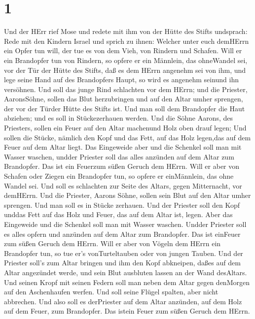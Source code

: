\hypertarget{section}{%
\section{1}\label{section}}

 Und der HErr rief Mose und redete mit ihm von der Hütte des
Stifts undsprach:  Rede mit den Kindern Israel und sprich zu
ihnen: Welcher unter euch demHErrn ein Opfer tun will, der tue es von
dem Vieh, von Rindern und Schafen.  Will er ein Brandopfer
tun von Rindern, so opfere er ein Männlein, das ohneWandel sei, vor der
Tür der Hütte des Stifts, daß es dem HErrn angenehm sei von ihm,
 und lege seine Hand auf des Brandopfers Haupt, so wird es
angenehm seinund ihn versöhnen.  Und soll das junge Rind
schlachten vor dem HErrn; und die Priester, AaronsSöhne, sollen das Blut
herzubringen und auf den Altar umher sprengen, der vor der Türder Hütte
des Stifts ist.  Und man soll dem Brandopfer die Haut
abziehen; und es soll in Stückezerhauen werden.  Und die
Söhne Aarons, des Priesters, sollen ein Feuer auf den Altar machenund
Holz oben drauf legen;  Und sollen die Stücke, nämlich den
Kopf und das Fett, auf das Holz legen,das auf dem Feuer auf dem Altar
liegt.  Das Eingeweide aber und die Schenkel soll man mit
Wasser waschen, undder Priester soll das alles anzünden auf dem Altar
zum Brandopfer. Das ist ein Feuerzum süßen Geruch dem HErrn.
 Will er aber von Schafen oder Ziegen ein Brandopfer tun,
so opfere er einMännlein, das ohne Wandel sei.  Und soll es
schlachten zur Seite des Altars, gegen Mitternacht, vor demHErrn. Und
die Priester, Aarons Söhne, sollen sein Blut auf den Altar umher
sprengen.  Und man soll es in Stücke zerhauen. Und der
Priester soll den Kopf unddas Fett auf das Holz und Feuer, das auf dem
Altar ist, legen.  Aber das Eingeweide und die Schenkel
soll man mit Wasser waschen. Undder Priester soll es alles opfern und
anzünden auf dem Altar zum Brandopfer. Das ist einFeuer zum süßen Geruch
dem HErrn.  Will er aber von Vögeln dem HErrn ein
Brandopfer tun, so tue er's vonTurteltauben oder von jungen Tauben.
 Und der Priester soll's zum Altar bringen und ihm den Kopf
abkneipen, daßes auf dem Altar angezündet werde, und sein Blut ausbluten
lassen an der Wand desAltars.  Und seinen Kropf mit seinen
Federn soll man neben dem Altar gegen denMorgen auf den Aschenhaufen
werfen.  Und soll seine Flügel spalten, aber nicht
abbrechen. Und also soll es derPriester auf dem Altar anzünden, auf dem
Holz auf dem Feuer, zum Brandopfer. Das istein Feuer zum süßen Geruch
dem HErrn.

